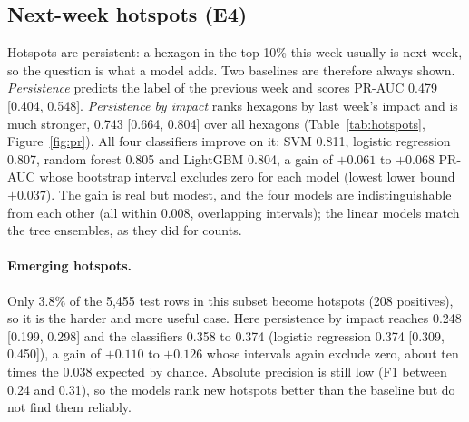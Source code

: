 \subsection{Next-week hotspots (E4)}
Hotspots are persistent: a hexagon in the top 10\% this week usually is next week, so the question is what a model adds. Two baselines are therefore always shown. \emph{Persistence} predicts the label of the previous week and scores PR-AUC 0.479 [0.404, 0.548]. \emph{Persistence by impact} ranks hexagons by last week's impact and is much stronger, 0.743 [0.664, 0.804] over all hexagons (Table~\ref{tab:hotspots}, Figure~\ref{fig:pr}). All four classifiers improve on it: SVM 0.811, logistic regression 0.807, random forest 0.805 and LightGBM 0.804, a gain of $+0.061$ to $+0.068$ PR-AUC whose bootstrap interval excludes zero for each model (lowest lower bound $+0.037$). The gain is real but modest, and the four models are indistinguishable from each other (all within 0.008, overlapping intervals); the linear models match the tree ensembles, as they did for counts.

\begin{table}[t]
\centering\small
\caption{T2, next-week hotspot classification (top 10\% of hexagons by weekly impact), four time-blocked folds. Intervals are 95\% cluster-bootstrap intervals that resample whole hexagons. ``Emerging'' keeps only hexagons that were not hotspots in the origin week. $\Delta$ is the PR-AUC difference from persistence by impact. The Brier score is not shown for that baseline because its scores are ranks, not probabilities; its F1 on the emerging subset is 0 by construction, since the subset contains none of the hexagons it flags.}
\label{tab:hotspots}
\resizebox{\linewidth}{!}{}
\end{table}

\paragraph{Emerging hotspots.} Only 3.8\% of the 5{,}455 test rows in this subset become hotspots (208 positives), so it is the harder and more useful case. Here persistence by impact reaches 0.248 [0.199, 0.298] and the classifiers 0.358 to 0.374 (logistic regression 0.374 [0.309, 0.450]), a gain of $+0.110$ to $+0.126$ whose intervals again exclude zero, about ten times the 0.038 expected by chance. Absolute precision is still low (F1 between 0.24 and 0.31), so the models rank new hotspots better than the baseline but do not find them reliably.

